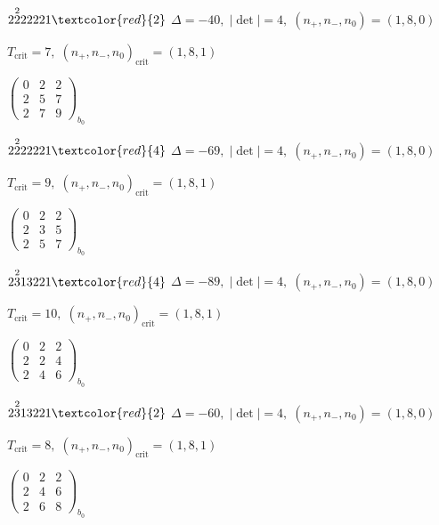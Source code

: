 \documentclass[10pt]{article}
\begin{document}
$2\overset{2}{2}22221\textcolor{red}{2}$ \quad $\Delta=-40,\; |\det|=4,\; (n_+,n_-,n_0)=(1,8,0)$

\hspace{1em}$T_{\text{crit}}=7,\; (n_+,n_-,n_0)_{\text{crit}}=(1,8,1)$

\hspace{2em}$\left(\begin{smallmatrix}0 & 2 & 2 \\ 2 & 5 & 7 \\ 2 & 7 & 9\end{smallmatrix}\right)_{\!b_0}$

$2\overset{2}{2}22221\textcolor{red}{4}$ \quad $\Delta=-69,\; |\det|=4,\; (n_+,n_-,n_0)=(1,8,0)$

\hspace{1em}$T_{\text{crit}}=9,\; (n_+,n_-,n_0)_{\text{crit}}=(1,8,1)$

\hspace{2em}$\left(\begin{smallmatrix}0 & 2 & 2 \\ 2 & 3 & 5 \\ 2 & 5 & 7\end{smallmatrix}\right)_{\!b_0}$

\smallskip

$2\overset{2}{3}13221\textcolor{red}{4}$ \quad $\Delta=-89,\; |\det|=4,\; (n_+,n_-,n_0)=(1,8,0)$

\hspace{1em}$T_{\text{crit}}=10,\; (n_+,n_-,n_0)_{\text{crit}}=(1,8,1)$

\hspace{2em}$\left(\begin{smallmatrix}0 & 2 & 2 \\ 2 & 2 & 4 \\ 2 & 4 & 6\end{smallmatrix}\right)_{\!b_0}$

$2\overset{2}{3}13221\textcolor{red}{2}$ \quad $\Delta=-60,\; |\det|=4,\; (n_+,n_-,n_0)=(1,8,0)$

\hspace{1em}$T_{\text{crit}}=8,\; (n_+,n_-,n_0)_{\text{crit}}=(1,8,1)$

\hspace{2em}$\left(\begin{smallmatrix}0 & 2 & 2 \\ 2 & 4 & 6 \\ 2 & 6 & 8\end{smallmatrix}\right)_{\!b_0}$
\end{document}
